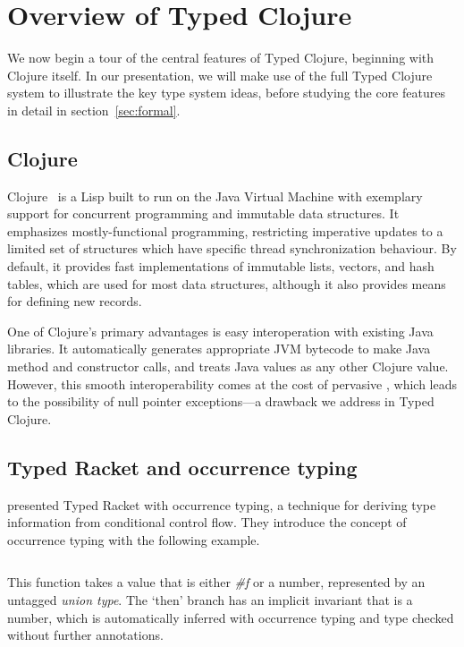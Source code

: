\section{Overview of Typed Clojure}

\label{sec:overview}

We now begin a tour of the central features of Typed Clojure,
beginning with Clojure itself. In our presentation, we will make 
use of the full Typed Clojure system to illustrate the key type system
ideas, before studying the core features in detail in
section~\ref{sec:formal}. 

\subsection{Clojure}

Clojure~\cite{Hic08} is a Lisp built to run on the
Java Virtual Machine with exemplary support for concurrent programming
and immutable data structures. It emphasizes mostly-functional
programming, restricting imperative updates to a limited set of
structures which have specific thread synchronization behaviour. By
default, it provides fast implementations of immutable lists, vectors,
and hash tables, which are used for most data structures, although it
also provides means for defining new records.

One of Clojure's primary advantages is easy interoperation with
existing Java libraries. It automatically generates appropriate JVM
bytecode to make Java method and constructor calls, and treats Java
values as any other Clojure value. However, this smooth
interoperability comes at the cost of pervasive , which
leads to the possibility of null pointer exceptions---a drawback we
address in Typed Clojure.

\subsection{Typed Racket and occurrence typing}

\citet{TF10}
presented Typed Racket with occurrence typing,
a technique for deriving type information from conditional control flow.
They introduce the concept of occurrence typing 
with the following example.

\inputminted[firstline=1]{racket}{code/tr/example1.rkt}

This function takes a value that is either \emph{\#f} %
or a number, represented by an untagged \emph{union type}.
The `then' branch has an implicit invariant
that  is a number, which is automatically inferred with occurrence typing
and type checked without further annotations.

